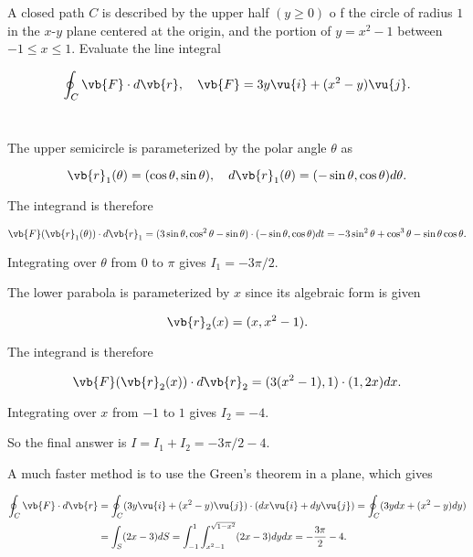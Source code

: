 \documentclass[english,a4paper,12pt]{report}
\begin{document}
{A closed path \(C\) is described by the upper half \((y \ge 0)\) o f the circle of radius \(1\) in the \(x\)-\(y\) plane centered at the origin, and the portion of \(y = x^2-1\) between \(-1 \le x \le 1\). Evaluate the line integral 

\begin{equation}
	\oint_{C} \vb{F} \cdot d\vb{r} , \quad \vb{F} = 3y \vu{i} + (x^2-y)\vu{j} .
\end{equation}
~
}
{The upper semicircle is parameterized by the polar angle \(\theta \) as

\begin{equation}
	\vb{r}_{1}  (\theta ) = (\cos \theta ,\sin \theta ), \quad d\vb{r} _{1}(\theta ) = (-\sin \theta ,\cos \theta )d\theta.
\end{equation}

The integrand is therefore 

\begin{equation}
	\vb{F} (\vb{r} _{1}(\theta ) ) \cdot d\vb{r} _{1} = (3 \sin \theta , \cos ^2\theta -\sin \theta ) \cdot (-\sin \theta ,\cos \theta ) dt = -3 \sin ^2 \theta + \cos ^3 \theta -\sin \theta \cos \theta . 
\end{equation}

Integrating over \(\theta \) from \(0 \) to \(\pi \) gives \(I_1  = -3\pi /2\).

The lower parabola is parameterized by \(x\) since its algebraic form is given

\begin{equation}
	\vb{r} _{2}(x) = (x, x^2-1). 
\end{equation}

The integrand is therefore 

\begin{equation}
	\vb{F} (\vb{r} _{2}(x) ) \cdot d\vb{r} _{2} = (3(x^2-1), 1) \cdot (1,2x)dx .
\end{equation}

Integrating over \(x\) from \(-1\) to \(1\) gives \(I_2 = -4\). 

So the final answer is \(I = I_1 +I_2 = -3 \pi /2 -4\). 

A much faster method is to use the Green's theorem in a plane, which gives

\begin{equation}
	\begin{aligned} 
	\oint_{C} \vb{F} \cdot d\vb{r} &= \oint_{C} (3y \vu{i} + (x^2-y)\vu{j} ) \cdot (dx \vu{i} + dy \vu{j} ) = \oint_{C} (3ydx+(x^2-y)dy) \\
	&= \int_{S}^{} (2x-3)dS =   \int_{-1}^{1} \int_{x^2-1}^{\sqrt{1-x^2} } (2x-3)dydx = -\frac{3\pi }{2} - 4.    
	\end{aligned} 
\end{equation}
~
} 
\end{document}
